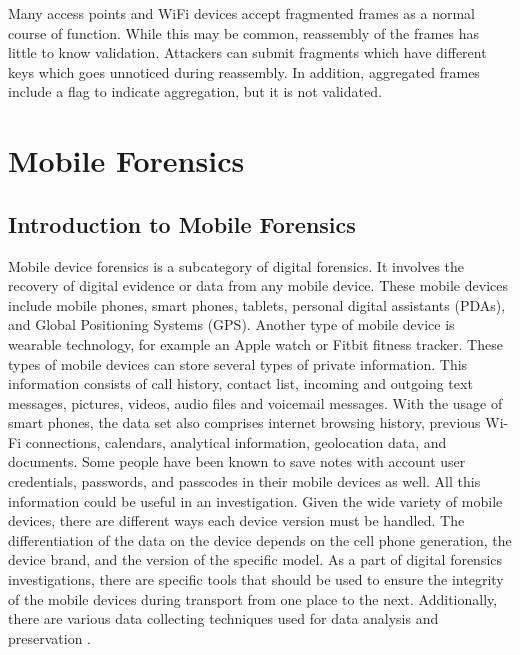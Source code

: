 \documentclass[acmlarge]{style/acmart}
\begin{document}
Many access points and WiFi devices accept fragmented frames as a normal course of function. While this may be common, reassembly of the frames has little to know validation. Attackers can submit fragments which have different keys which goes unnoticed during reassembly. In addition, aggregated frames include a flag to indicate aggregation, but it is not validated.



\section{Mobile Forensics}
\subsection{Introduction to Mobile Forensics}
Mobile device forensics is a subcategory of digital forensics.  It involves the recovery of digital evidence or data from any mobile device.  These mobile devices include mobile phones, smart phones, tablets, personal digital assistants (PDAs), and Global Positioning Systems (GPS).  Another type of mobile device is wearable technology, for example an Apple watch or Fitbit fitness tracker.  These types of mobile devices can store several types of private information.  This information consists of call history, contact list, incoming and outgoing text messages, pictures, videos, audio files and voicemail messages. With the usage of smart phones, the data set also comprises internet browsing history, previous Wi-Fi connections, calendars, analytical information, geolocation data, and documents.  Some people have been known to save notes with account user credentials, passwords, and passcodes in their mobile devices as well.  All this information could be useful in an investigation.  Given the wide variety of mobile devices, there are different ways each device version must be handled.  The differentiation of the data on the device depends on the cell phone generation, the device brand, and the version of the specific model.  As a part of digital forensics investigations, there are specific tools that should be used to ensure the integrity of the mobile devices during transport from one place to the next.  Additionally, there are various data collecting techniques used for data analysis and preservation \cite{duc_2015}.
\end{document}
